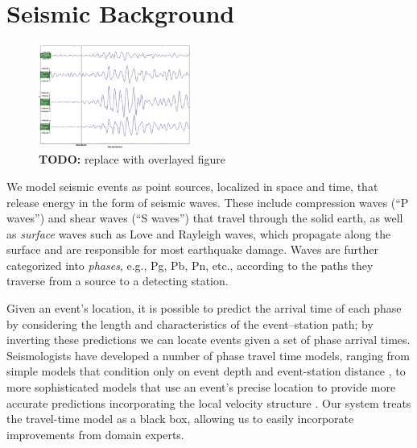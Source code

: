 \documentclass[twoside]{article} \usepackage{aistats2017}
\newcommand{\todo}[1]{{\color{red} \textbf{TODO:} {#1}}}
\begin{document}

\section{Seismic Background}

\begin{figure}
\centering
\includegraphics[width=0.45\textwidth]{correlation_dprk}
\caption{\todo{replace with overlayed figure}}
\label{fig:dprk_correlations}
\end{figure}

We model seismic events as point sources, localized in space and time,
that release energy in the form of seismic waves. These include
compression waves (``P waves'') and shear waves (``S waves'') that
travel through the solid earth, as well as {\em surface} waves such as
Love and Rayleigh waves, which propagate along the surface and are
responsible for most earthquake damage. Waves are further categorized
into {\em phases}, e.g., Pg, Pb, Pn, etc., according to the paths they traverse from a source to a detecting station. 

Given an event's location, it is possible to predict the arrival time of each phase by
considering the length and characteristics of the event--station
path; by inverting these predictions we can locate events given
a set of phase arrival times.  Seismologists have developed a number of phase travel
time models, ranging from simple models that condition only on event
depth and event-station distance \citep{iaspei91}, to more sophisticated models
that use an event's precise location to provide more
accurate predictions incorporating the local velocity structure \citep{simmons2012llnl}. Our system
treats the travel-time model as a black box, allowing us to easily incorporate improvements from domain experts. 
\end{document}

